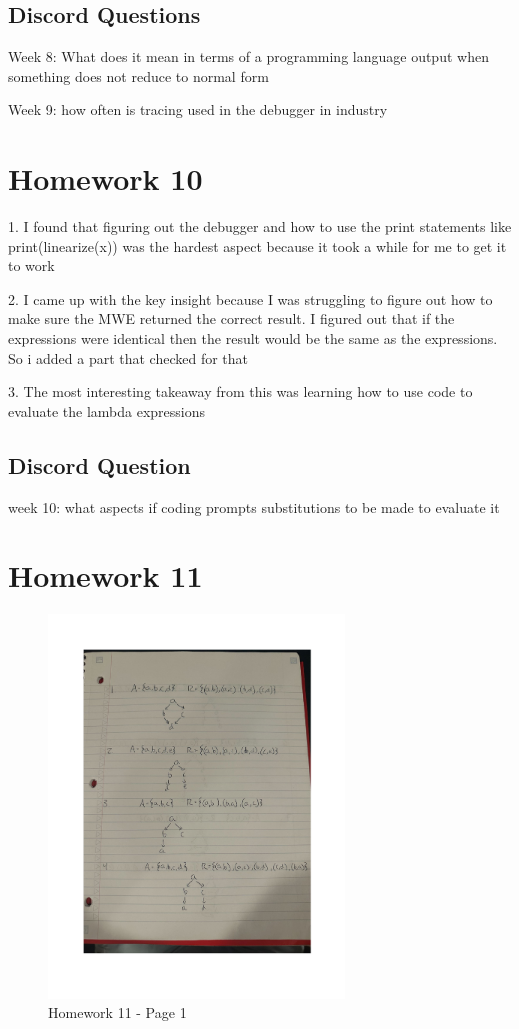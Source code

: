 \documentclass{article}
\theoremstyle{plain}
\theoremstyle{definition}
\theoremstyle{remark}
\begin{document}
\subsection{Discord Questions}

Week 8: What does it mean in terms of a programming language output when something does not reduce to normal form

Week 9: how often is tracing used in the debugger in industry


\section{Homework 10}\label{homework10}

1. I found that figuring out the debugger and how to use the print statements like print(linearize(x)) was the hardest aspect because it took a while for me to get it to work

2. I came up with the key insight because I was struggling to figure out how to make sure the MWE returned the correct result. I figured out that if the expressions were identical then the result would be the same as the expressions. So i added a part that checked for that

3. The most interesting takeaway from this was learning how to use code to evaluate the lambda expressions

\subsection{Discord Question}

week 10: what aspects if coding prompts substitutions to be made to evaluate it

\section{Homework 11}\label{homework11}

\begin{figure}[H]
  \centering
  \includegraphics[width=0.7\textwidth, page=1]{HW11.pdf}
  \caption{Homework 11 - Page 1}
  \label{fig:homework11_page1}
\end{figure}
\end{document}
